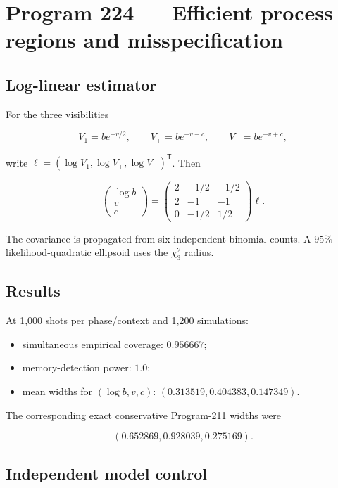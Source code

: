 \documentclass[11pt,a4paper,openany]{report}
\begin{document}
\chapter{Program 224 --- Efficient process regions and misspecification}

\section{Log-linear estimator}

For the three visibilities

\[
V_1=be^{-v/2},
\qquad
V_+=be^{-v-c},
\qquad
V_-=be^{-v+c},
\]

write \(\ell=(\log V_1,\log V_+,\log V_-)^\mathsf T\). Then

\[
\begin{pmatrix}
\log b\\
v\\
c
\end{pmatrix}
=
\begin{pmatrix}
2&-1/2&-1/2\\
2&-1&-1\\
0&-1/2&1/2
\end{pmatrix}
\ell.
\]

The covariance is propagated from six independent binomial counts. A \(95\%\) likelihood-quadratic ellipsoid uses the \(\chi^2_3\) radius.

\section{Results}

At 1,000 shots per phase/\allowbreak{}context and 1,200 simulations:

\begin{itemize}
\item 
simultaneous empirical coverage: \(0.956667\);

\item 
memory-detection power: \(1.0\);

\item 
mean widths for \((\log b,v,c)\): \((0.313519,0.404383,0.147349)\).

\end{itemize}

The corresponding exact conservative Program-211 widths were

\[
(0.652869,0.928039,0.275169).
\]

\section{Independent model control}
\end{document}
